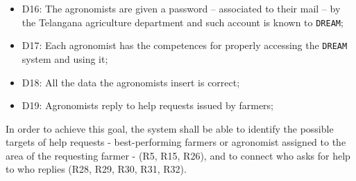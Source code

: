 \documentclass{article}
\begin{document}
\begin{itemize}
    \item D16: The agronomists are given a password – associated to their mail – by the Telangana agriculture department and such account is known to \verb|DREAM|;

    \item D17: Each agronomist has the competences for properly accessing the \verb|DREAM| system and using it;
  
    \item D18: All the data the agronomists insert is correct;
  
    \item D19: Agronomists reply to help requests issued by farmers;

\end{itemize}
In order to achieve this goal, the system shall be able to identify the possible targets of help requests - best-performing farmers or agronomist assigned to the area of the requesting farmer - (R5, R15, R26), and to connect who asks for help to who replies (R28, R29, R30, R31, R32).
\end{document}

